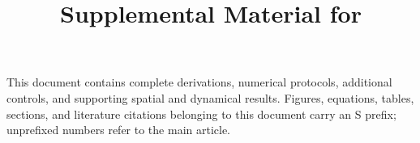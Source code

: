 \documentclass[aps,pre,reprint,amsmath,amssymb,longbibliography]{revtex4-2}
\begin{document}
\raggedbottom
\title{Supplemental Material for\\\papertitle}
\paperauthorblock
\maketitle
\noindent
This document contains complete derivations, numerical protocols, additional
controls, and supporting spatial and dynamical results. Figures, equations,
tables, sections, and literature citations belonging to this document carry
an S prefix; unprefixed numbers refer to the main article.


\onecolumngrid
\clearpage


\end{document}
